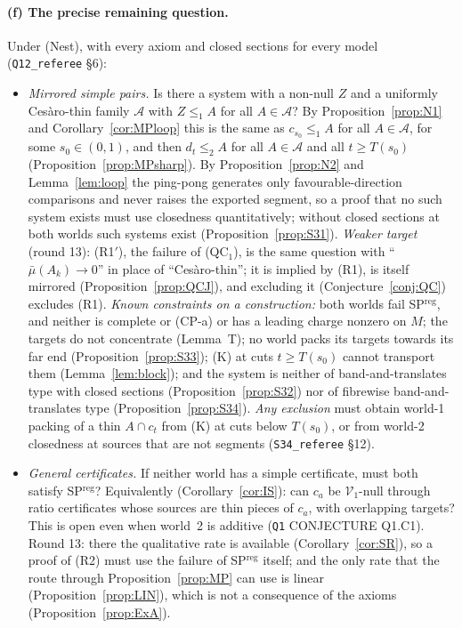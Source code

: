 \documentclass[11pt]{article}
\theoremstyle{definition}
\theoremstyle{remark}
\newcommand{\src}[1]{\texttt{#1}}
\begin{document}
\paragraph{(f) The precise remaining question.} Under (Nest), with every axiom and closed sections for every model (\src{Q12\_referee} \S6):
\begin{itemize}[leftmargin=*]
\item[\textbf{(R1)}] \emph{Mirrored simple pairs.} Is there a system with a non-null $Z$ and a uniformly Ces\`aro-thin family $\mathcal A$ with $Z\le_1A$ for all $A\in\mathcal A$? By Proposition~\ref{prop:N1} and Corollary~\ref{cor:MPloop} this is the same as $c_{s_0}\le_1A$ for all $A\in\mathcal A$, for some $s_0\in(0,1)$, and then $d_t\le_2A$ for all $A\in\mathcal A$ and all $t\ge T(s_0)$ (Proposition~\ref{prop:MPsharp}). By Proposition~\ref{prop:N2} and Lemma~\ref{lem:loop} the ping-pong generates only favourable-direction comparisons and never raises the exported segment, so a proof that no such system exists must use closedness quantitatively; without closed sections at both worlds such systems exist (Proposition~\ref{prop:S31}). \emph{Weaker target} (round 13): (R1$'$), the failure of (QC$_1$), is the same question with ``$\bar\mu(A_k)\to0$'' in place of ``Ces\`aro-thin''; it is implied by (R1), is itself mirrored (Proposition~\ref{prop:QCJ}), and excluding it (Conjecture~\ref{conj:QC}) excludes (R1). \emph{Known constraints on a construction:} both worlds fail SP$^{\mathrm{reg}}$, and neither is complete or (CP-a) or has a leading charge nonzero on $M$; the targets do not concentrate (Lemma~T); no world packs its targets towards its far end (Proposition~\ref{prop:S33}); (K) at cuts $t\ge T(s_0)$ cannot transport them (Lemma~\ref{lem:block}); and the system is neither of band-and-translates type with closed sections (Proposition~\ref{prop:S32}) nor of fibrewise band-and-translates type (Proposition~\ref{prop:S34}). \emph{Any exclusion} must obtain world-1 packing of a thin $A\cap c_t$ from (K) at cuts below $T(s_0)$, or from world-2 closedness at sources that are not segments (\src{S34\_referee} \S12).
\item[\textbf{(R2)}] \emph{General certificates.} If neither world has a simple certificate, must both satisfy SP$^{\mathrm{reg}}$? Equivalently (Corollary~\ref{cor:IS}): can $c_a$ be $\mathcal V_1$-null through ratio certificates whose sources are thin pieces of $c_a$, with overlapping targets? This is open even when world~2 is additive (\src{Q1} CONJECTURE Q1.C1). Round 13: there the qualitative rate is available (Corollary~\ref{cor:SR}), so a proof of (R2) must use the failure of SP$^{\mathrm{reg}}$ itself; and the only rate that the route through Proposition~\ref{prop:MP} can use is linear (Proposition~\ref{prop:LIN}), which is not a consequence of the axioms (Proposition~\ref{prop:ExA}).

\end{itemize}
\end{document}
